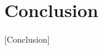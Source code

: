 \documentclass[linenumbers]{aastex701}
\begin{document}
\section{Conclusion} \label{sec:conclusion}

[Conclusion]

\begin{acknowledgments}
[Acknowledgments]
\end{acknowledgments}



\end{document}
